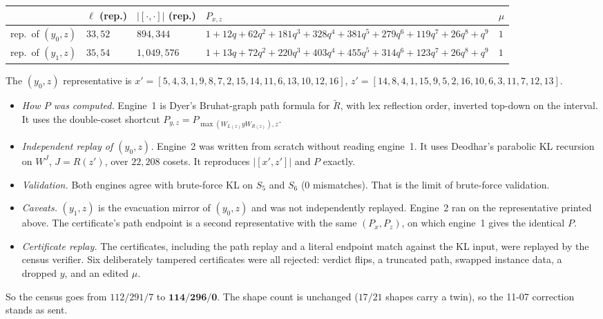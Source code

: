 \documentclass[11pt]{amsart}
\theoremstyle{definition}
\begin{document}
{\footnotesize\begin{tabular}{@{}lllll@{}}\toprule
 & $\ell$ (rep.) & $|[\cdot,\cdot]|$ (rep.) & $P_{x,z}$ & $\mu$\\\midrule
rep.\ of $(y_0,z)$ & $33,52$ & $894{,}344$ & $1+12q+62q^2+181q^3+328q^4+381q^5+279q^6+119q^7+26q^8+q^9$ & $1$\\
rep.\ of $(y_1,z)$ & $35,54$ & $1{,}049{,}576$ & $1+13q+72q^2+220q^3+403q^4+455q^5+314q^6+123q^7+26q^8+q^9$ & $1$\\\bottomrule
\end{tabular}}

\smallskip
\noindent The $(y_0,z)$ representative is $x'=[5,4,3,1,9,8,7,2,15,14,11,6,13,10,12,16]$, $z'=[14,8,4,1,15,9,5,2,16,10,6,3,11,7,12,13]$.

\begin{itemize}[leftmargin=*]
\item \emph{How $P$ was computed.} Engine~1 is Dyer's Bruhat-graph path formula for $\tilde R$, with lex reflection order, inverted top-down on the interval. It uses the double-coset shortcut $P_{y,z}=P_{\max(W_{L(z)}yW_{R(z)}),z}$.
\item \emph{Independent replay of $(y_0,z)$.} Engine~2 was written from scratch without reading engine~1. It uses Deodhar's parabolic KL recursion on $W^J$, $J=R(z')$, over $22{,}208$ cosets. It reproduces $|[x',z']|$ and $P$ exactly.
\item \emph{Validation.} Both engines agree with brute-force KL on $S_5$ and $S_6$ ($0$ mismatches). That is the limit of brute-force validation.
\item \emph{Caveats.} $(y_1,z)$ is the evacuation mirror of $(y_0,z)$ and was not independently replayed. Engine~2 ran on the representative printed above. The certificate's path endpoint is a second representative with the same $(P_x,P_z)$, on which engine~1 gives the identical $P$.
\item \emph{Certificate replay.} The certificates, including the path replay and a literal endpoint match against the KL input, were replayed by the census verifier. Six deliberately tampered certificates were all rejected: verdict flips, a truncated path, swapped instance data, a dropped $y$, and an edited $\mu$.
\end{itemize}

\noindent So the census goes from $112/291/7$ to $\mathbf{114/296/0}$. The shape count is unchanged ($17/21$ shapes carry a twin), so the 11-07 correction stands as sent.
\end{document}
